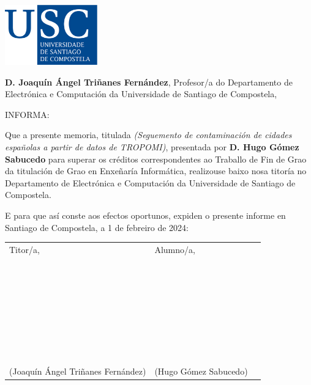 \pagestyle{plain}
\includegraphics[width=4cm]{figuras/logo_usc.eps}

\vspace{1cm}
{\bf D. Joaquín Ángel Triñanes Fernández}, Profesor/a do Departamento de Electrónica e Computación da Universidade de Santiago de Compostela,

\vspace{1cm}
INFORMA:

\vspace{1cm}
Que a presente memoria, titulada {\it (Seguemento de contaminación de cidades españolas a partir de datos de TROPOMI)}, presentada por {\bf D. Hugo Gómez Sabucedo} para superar os créditos
correspondentes ao Traballo de Fin de Grao da titulación de Grao en Enxeñaría Informática, realizouse baixo nosa titoría no Departamento de Electrónica e Computación da Universidade de Santiago de Compostela.

\vspace{1cm}
E para que así conste aos efectos oportunos, expiden o presente informe en Santiago de Compostela, a 1 de febreiro de 2024:

\vspace{2cm}
\begin{tabular}{lll}
	Titor/a, & Alumno/a, \\
	~ \\
	~ \\
	~ \\
	~ \\
	~ \\
	~ \\
	~ \\
	(Joaquín Ángel Triñanes Fernández) & (Hugo Gómez Sabucedo)
\end{tabular}

